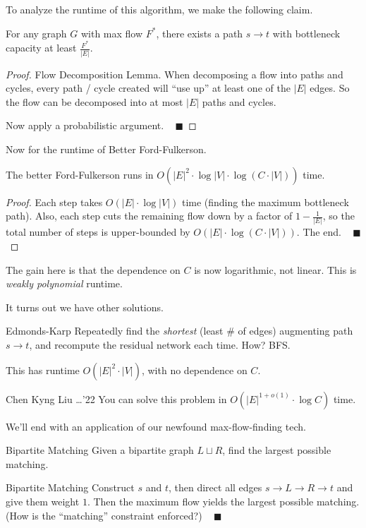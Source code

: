 To analyze the runtime of this algorithm, we make the following claim.

\begin{claim}
    For any graph $G$ with max flow $F^*$, there exists a path $s \to t$ with bottleneck capacity at least $\frac{F^*}{|E|}$.
\end{claim}

\begin{proof}
    Flow Decomposition Lemma.  When decomposing a flow into paths and cycles, every path / cycle created will ``use up'' at least one of the $|E|$ edges.  So the flow can be decomposed into at most $|E|$ paths and cycles.
    
    Now apply a probabilistic argument. ~ $\blacksquare$
\end{proof}

Now for the runtime of Better Ford-Fulkerson.

\begin{claim}
    The better Ford-Fulkerson runs in $O(|E|^2 \cdot \log |V| \cdot \log (C \cdot |V|))$ time.
\end{claim}

\begin{proof}
    Each step takes $O(|E| \cdot \log|V|)$ time (finding the maximum bottleneck path).  Also, each step cuts the remaining flow down by a factor of $1 - \frac{1}{|E|}$, so the total number of steps is upper-bounded by $O(|E| \cdot \log(C \cdot |V|))$.  The end. ~ $\blacksquare$
\end{proof}

The gain here is that the dependence on $C$ is now logarithmic, not linear.  This is \emph{weakly polynomial} runtime.

It turns out we have other solutions.

\begin{solution}{Edmonds-Karp}
    Repeatedly find the \emph{shortest} (least \# of edges) augmenting path $s \to t$, and recompute the residual network each time.  How?  BFS.

    This has runtime $O(|E|^2 \cdot |V|)$, with no dependence on $C$.
\end{solution}

\begin{solution}{Chen Kyng Liu \dots '22}
    You can solve this problem in $O(|E|^{1 + o(1)} \cdot \log C)$ time.
\end{solution}

We'll end with an application of our newfound max-flow-finding tech.

\begin{problem}{Bipartite Matching}
    Given a bipartite graph $L \sqcup R$, find the largest possible matching.
\end{problem}

\begin{solution}{Bipartite Matching}
    Construct $s$ and $t$, then direct all edges $s \to L \to R \to t$ and give them weight $1$.  Then the maximum flow yields the largest possible matching.   (How is the ``matching'' constraint enforced?)  ~ $\blacksquare$
\end{solution}

